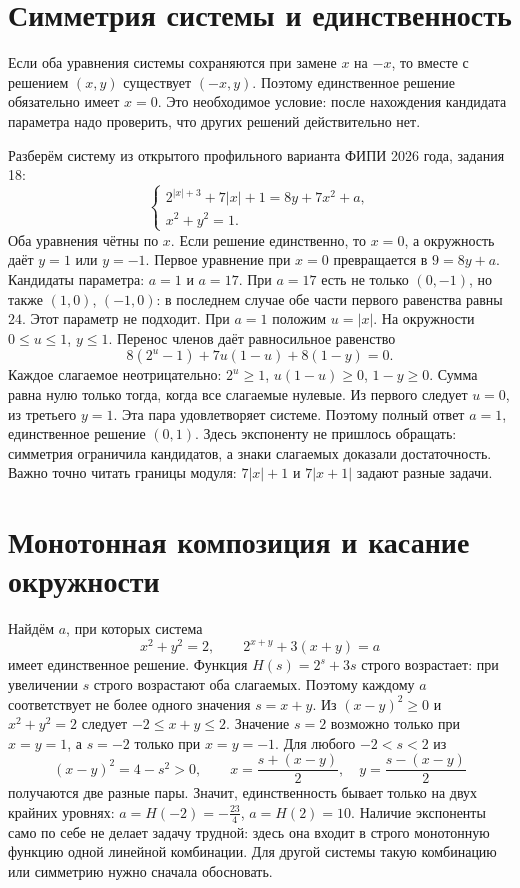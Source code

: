 \section{Симметрия системы и единственность}
Если оба уравнения системы сохраняются при замене \(x\) на \(-x\), то вместе с решением \((x,y)\) существует \((-x,y)\). Поэтому единственное решение обязательно имеет \(x=0\). Это необходимое условие: после нахождения кандидата параметра надо проверить, что других решений действительно нет.
\begin{example}\label{ex:review-ege-last-full-system}
Разберём систему из открытого профильного варианта ФИПИ 2026 года, задания 18:
\[
\begin{cases}
2^{|x|+3}+7|x|+1=8y+7x^2+a,\\
x^2+y^2=1.
\end{cases}
\]
Оба уравнения чётны по \(x\). Если решение единственно, то \(x=0\), а окружность даёт \(y=1\) или \(y=-1\). Первое уравнение при \(x=0\) превращается в \(9=8y+a\). Кандидаты параметра: \(a=1\) и \(a=17\).
При \(a=17\) есть не только \((0,-1)\), но также \((1,0)\), \((-1,0)\): в последнем случае обе части первого равенства равны \(24\). Этот параметр не подходит.
При \(a=1\) положим \(u=|x|\). На окружности \(0\le u\le1\), \(y\le1\). Перенос членов даёт равносильное равенство
\[
8(2^u-1)+7u(1-u)+8(1-y)=0.
\]
Каждое слагаемое неотрицательно: \(2^u\ge1\), \(u(1-u)\ge0\), \(1-y\ge0\). Сумма равна нулю только тогда, когда все слагаемые нулевые. Из первого следует \(u=0\), из третьего \(y=1\). Эта пара удовлетворяет системе. Поэтому полный ответ \(\boxed{a=1}\), единственное решение \((0,1)\).
Здесь экспоненту не пришлось обращать: симметрия ограничила кандидатов, а знаки слагаемых доказали достаточность. Важно точно читать границы модуля: \(7|x|+1\) и \(7|x+1|\) задают разные задачи.
\end{example}

\section{Монотонная композиция и касание окружности}
\begin{example}\label{ex:review-ege-last-monotone}
Найдём \(a\), при которых система
\[
x^2+y^2=2,\qquad 2^{x+y}+3(x+y)=a
\]
имеет единственное решение. Функция \(H(s)=2^s+3s\) строго возрастает: при увеличении \(s\) строго возрастают оба слагаемых. Поэтому каждому \(a\) соответствует не более одного значения \(s=x+y\).
Из \((x-y)^2\ge0\) и \(x^2+y^2=2\) следует \(-2\le x+y\le2\). Значение \(s=2\) возможно только при \(x=y=1\), а \(s=-2\) только при \(x=y=-1\). Для любого \(-2<s<2\) из
\[
(x-y)^2=4-s^2>0,\qquad
x=\frac{s+(x-y)}2,\quad y=\frac{s-(x-y)}2
\]
получаются две разные пары. Значит, единственность бывает только на двух крайних уровнях: \(a=H(-2)=-\frac{23}{4}\), \(a=H(2)=10\).
Наличие экспоненты само по себе не делает задачу трудной: здесь она входит в строго монотонную функцию одной линейной комбинации. Для другой системы такую комбинацию или симметрию нужно сначала обосновать.
\end{example}
